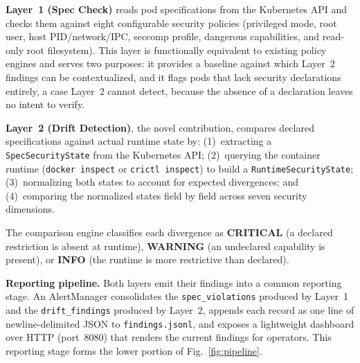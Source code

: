 \documentclass[conference]{IEEEtran}
\begin{document}
\textbf{Layer~1 (Spec Check)} reads pod specifications from the Kubernetes API and checks them against eight configurable security policies (privileged mode, root user, host PID/network/IPC, seccomp profile, dangerous capabilities, and read-only root filesystem). This layer is functionally equivalent to existing policy engines and serves two purposes: it provides a baseline against which Layer~2 findings can be contextualized, and it flags pods that lack security declarations entirely, a case Layer~2 cannot detect, because the absence of a declaration leaves no intent to verify.

\textbf{Layer~2 (Drift Detection)}, the novel contribution, compares declared specifications against actual runtime state by: (1)~extracting a \texttt{SpecSecurityState} from the Kubernetes API; (2)~querying the container runtime (\texttt{docker inspect} or \texttt{crictl inspect}) to build a \texttt{RuntimeSecurityState}; (3)~normalizing both states to account for expected divergences; and (4)~comparing the normalized states field by field across seven security dimensions.

The comparison engine classifies each divergence as \textbf{CRITICAL} (a declared restriction is absent at runtime), \textbf{WARNING} (an undeclared capability is present), or \textbf{INFO} (the runtime is more restrictive than declared).

\textbf{Reporting pipeline.} Both layers emit their findings into a common reporting stage. An AlertManager consolidates the \texttt{spec\_violations} produced by Layer~1 and the \texttt{drift\_findings} produced by Layer~2, appends each record as one line of newline-delimited JSON to \texttt{findings.jsonl}, and exposes a lightweight dashboard over HTTP (port~8080) that renders the current findings for operators. This reporting stage forms the lower portion of Fig.~\ref{fig:pipeline}.
\end{document}
